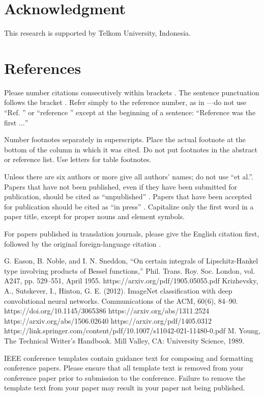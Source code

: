 \documentclass[conference]{IEEEtran}
\begin{document}
\section*{Acknowledgment}

This research is supported by Telkom University, Indonesia.

\section*{References}

Please number citations consecutively within brackets \cite{b1}. The 
sentence punctuation follows the bracket \cite{b2}. Refer simply to the reference 
number, as in \cite{b3}---do not use ``Ref. \cite{b3}'' or ``reference \cite{b3}'' except at 
the beginning of a sentence: ``Reference \cite{b3} was the first $\ldots$''

Number footnotes separately in superscripts. Place the actual footnote at 
the bottom of the column in which it was cited. Do not put footnotes in the 
abstract or reference list. Use letters for table footnotes.

Unless there are six authors or more give all authors' names; do not use 
``et al.''. Papers that have not been published, even if they have been 
submitted for publication, should be cited as ``unpublished'' \cite{b4}. Papers 
that have been accepted for publication should be cited as ``in press'' \cite{b5}. 
Capitalize only the first word in a paper title, except for proper nouns and 
element symbols.

For papers published in translation journals, please give the English 
citation first, followed by the original foreign-language citation \cite{b6}.

\begin{thebibliography}{00}
 G. Eason, B. Noble, and I. N. Sneddon, ``On certain integrals of Lipschitz-Hankel type involving products of Bessel functions,'' Phil. Trans. Roy. Soc. London, vol. A247, pp. 529--551, April 1955.
 https://arxiv.org/pdf/1905.05055.pdf
 Krizhevsky, A., Sutskever, I., Hinton, G. E. (2012). ImageNet classification with deep convolutional neural networks. Communications of the ACM, 60(6), 84–90. https://doi.org/10.1145/3065386
 https://arxiv.org/abs/1311.2524
 https://arxiv.org/abs/1506.02640
 https://arxiv.org/pdf/1405.0312
 https://link.springer.com/content/pdf/10.1007/s11042-021-11480-0.pdf
 M. Young, The Technical Writer's Handbook. Mill Valley, CA: University Science, 1989.
\end{thebibliography}
\vspace{12pt}
\color{red}
IEEE conference templates contain guidance text for composing and formatting conference papers. Please ensure that all template text is removed from your conference paper prior to submission to the conference. Failure to remove the template text from your paper may result in your paper not being published.
\end{document}
